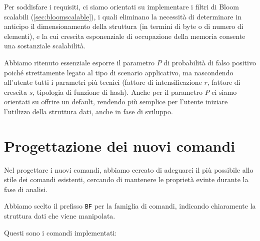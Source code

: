 Per soddisfare i requisiti, ci siamo orientati su implementare i filtri di Bloom
scalabili (\autoref{sec:bloomscalable}), i quali eliminano la necessità di determinare in anticipo il
dimensionamento della struttura (in termini di byte o di numero di elementi), e la cui crescita
esponenziale di occupazione della memoria consente una sostanziale scalabilità.

Abbiamo ritenuto essenziale esporre il parametro $P$ di probabilità di falso positivo poiché
strettamente legato al tipo di scenario applicativo, ma nascondendo all'utente tutti i parametri più
tecnici (fattore di intensificazione $r$, fattore di crescita $s$, tipologia di funzione di hash).
Anche per il parametro $P$ ci siamo orientati su offrire un default, rendendo più semplice per
l'utente iniziare l'utilizzo della struttura dati, anche in fase di sviluppo.

\section{Progettazione dei nuovi comandi}
\label{sec:patch:newcommands}

Nel progettare i nuovi comandi, abbiamo cercato di adeguarci il più possibile allo stile dei
comandi esistenti, cercando di mantenere le proprietà evinte durante la fase di analisi.

Abbiamo scelto il prefisso \verb|BF| per la famiglia di comandi, indicando chiaramente la
struttura dati che viene manipolata.

Questi sono i comandi implementati:


